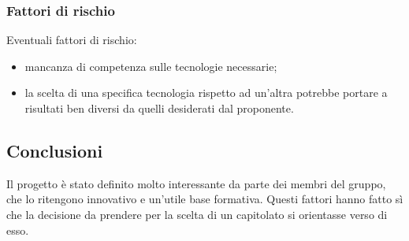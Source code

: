 		\subsubsection {Fattori di rischio}
		Eventuali fattori di rischio:
			\begin {itemize}
				\item mancanza di competenza sulle tecnologie necessarie;
				\item la scelta di una specifica tecnologia rispetto ad un'altra potrebbe portare a risultati ben diversi da quelli desiderati dal proponente.
			\end {itemize}
	\subsection {Conclusioni}
	Il progetto è stato definito molto interessante da parte dei membri del gruppo, che lo ritengono innovativo e un'utile base formativa. Questi fattori hanno fatto sì che la decisione da prendere per la scelta di un capitolato si orientasse verso di esso.
